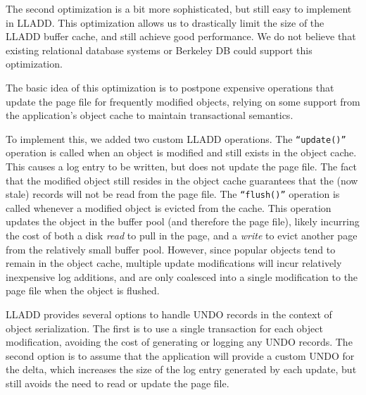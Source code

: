 \documentclass[10pt,letterpaper,twocolumn,english]{article}
\newcommand{\yad}{LLADD\xspace}
\begin{document}


The second optimization is a bit more sophisticated, but still easy to
implement in \yad.  This optimization allows us to drastically limit
the size of the
\yad buffer cache, and still achieve good performance.
We do not believe that existing relational database systems or Berkeley DB could support this optimization.

The basic idea of this optimization is to postpone expensive
operations that update the page file for frequently modified objects,
relying on some support from the application's object cache
to maintain transactional semantics.

To implement this, we added two custom \yad operations. The
{\tt``update()''} operation is called when an object is modified and
still exists in the object cache. This causes a log entry to be
written, but does not update the page file. The fact that the modified
object still resides in the object cache guarantees that the (now stale)
records will not be read from the page file. The {\tt ``flush()''}
operation is called whenever a modified object is evicted from the
cache. This operation updates the object in the buffer pool (and
therefore the page file), likely incurring the cost of both a disk {\em
read} to pull in the page, and a {\em write} to evict another page
from the relatively small buffer pool.  However, since popular 
objects tend to remain in the object cache, multiple update
modifications will incur relatively inexpensive log additions,
and are only coalesced into a single modification to the page file
when the object is flushed.

\yad provides several options  to handle UNDO records in the context
of object serialization. The first is to use a single transaction for
each object modification, avoiding the cost of generating or logging
any UNDO records. The second option is to assume that the
application will provide a custom UNDO for the delta, 
which increases the size of the log entry generated by each update, 
but still avoids the need to read or update the page
file.
\end{document}
